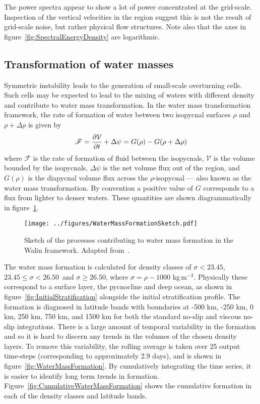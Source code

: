 The power spectra appear to show a lot of power concentrated at the grid-scale. Inspection of the vertical velocities in the region suggest this is not the result of grid-scale noise, but rather physical flow structures. Note also that the axes in figure~\ref{fig:SpectralEnergyDensity} are logarithmic.

\subsection{Transformation of water masses}
\label{subsubsec:WaterMassTransformation}
Symmetric instability leads to the generation of small-scale overturning cells. Such cells may be expected to lead to the mixing of waters with different density and contribute to water mass transformation. In the \citet{Walin1982} water mass transformation framework, the rate of formation of water between two isopycnal surfaces $\rho$ and $\rho + \Delta \rho$ is given by
\begin{equation}
    \mathscr{F} = \pdv{\mathcal{V}}{t} + \Delta \psi = G(\rho) - G(\rho + \Delta \rho)
    \label{eq:WallinFormation}
\end{equation}
where $\mathscr{F}$ is the rate of formation of fluid between the isopycnals, $\mathcal{V}$ is the volume bounded by the isopycnals, $\Delta \psi$ is the net volume flux out of the region, and $G(\rho)$ is the diapycnal volume flux across the $\rho$-isopycnal --- also known as the water mass transformation. By convention a positive value of $G$ corresponds to a flux from lighter to denser waters. These quantities are shown diagrammatically in figure~\ref{fig:WaterMassFormationSketch}.

\begin{figure} 
    \centering
    \texttt{[image: ../figures/WaterMassFormationSketch.pdf]}
    \caption{Sketch of the processes contributing to water mass formation in the Walin framework. Adapted from~\citet{Williams2011}.}
    \label{fig:WaterMassFormationSketch}
\end{figure}

The water mass formation is calculated for density classes of $\sigma < 23.45$, $23.45 \leq \sigma < 26.50$~and $\sigma \geq 26.50$, where $\sigma = \rho - 1000$ kg\,m$^{-3}$. Physically these correspond to a surface layer, the pycnocline and deep ocean, as shown in figure~\ref{fig:InitialStratification} alongside the initial stratification profile. The formation is diagnosed in latitude bands with boundaries at -500 km, -250 km, 0 km, 250 km, 750 km, and 1500 km for both the standard no-slip  and viscous no-slip integrations. There is a large amount of temporal variability in the formation and so it is hard to discern any trends in the volumes of the chosen density layers. To remove this variability, the rolling average is taken over 25 output time-steps (corresponding to approximately 2.9 days), and is shown in figure~\ref{fig:WaterMassFormation}. By cumulatively integrating the time series, it is easier to identify long term trends in formation. Figure~\ref{fig:CumulativeWaterMassFormation} shows the cumulative formation in each of the density classes and latitude bands.

